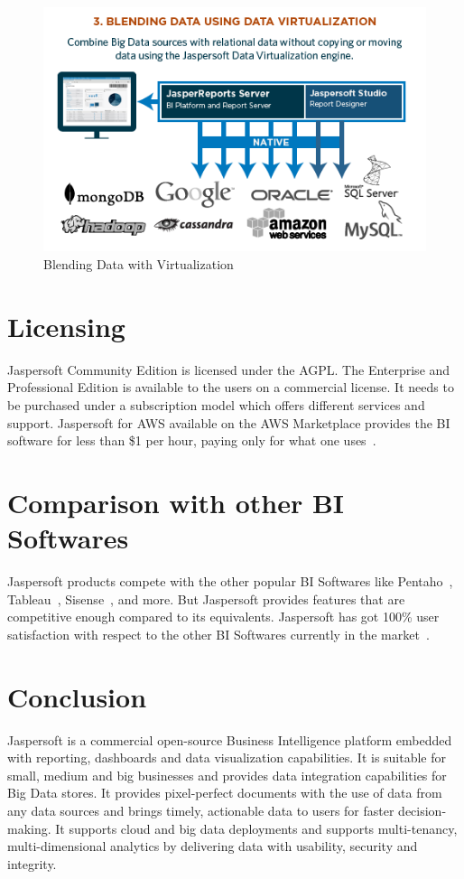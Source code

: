 \begin{figure}[!ht]
        \centering\includegraphics[width=\columnwidth]{../images/blending-with-virtualization.png}
        \caption{Blending Data with Virtualization~\cite{hid-sp18-516-www-jaspersoft-big-data}}
        \label{fig:blending-with-virtualization}
\end{figure}


\section{Licensing}
Jaspersoft Community Edition is licensed under the AGPL. The Enterprise and
Professional Edition is available to the users on a commercial license. It needs
to be purchased under a subscription model which offers different services and
support. Jaspersoft for AWS available on the AWS Marketplace provides the BI
software for less than \$1 per hour, paying only for what one
uses~\cite{hid-sp18-516-www-jaspersoft-licensing}. 


\section{Comparison with other BI Softwares}
Jaspersoft products compete with the other popular BI Softwares like
Pentaho~\cite{hid-sp18-516-www-pentaho},
Tableau~\cite{hid-sp18-516-www-tableau},
Sisense~\cite{hid-sp18-516-www-sisense}, and more. But Jaspersoft provides
features that are competitive enough compared to its equivalents. Jaspersoft has
got 100\% user satisfaction with respect to the other BI Softwares currently in
the market~\cite{hid-sp18-516-www-finances-online-comparisons}. 


\section{Conclusion}
Jaspersoft is a commercial open-source Business Intelligence platform embedded
with reporting, dashboards and data visualization capabilities. It is suitable
for small, medium and big businesses and provides data integration capabilities
for Big Data stores. It provides pixel-perfect documents with the use of data
from any data sources and brings timely, actionable data to users for faster
decision-making. It supports cloud and big data deployments and supports
multi-tenancy, multi-dimensional analytics by delivering data with usability,
security and integrity. 

